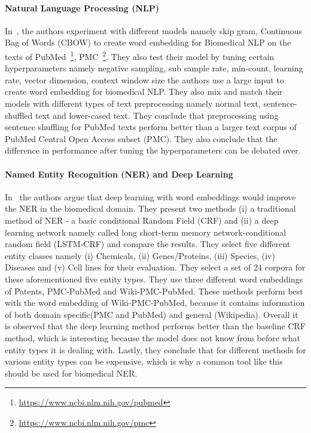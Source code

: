 \paragraph{Natural Language Processing (NLP)}
In~\cite{chiu2016train}, the authors experiment with different models namely skip gram, Continuous Bag of Words (CBOW)  to create word embedding for Biomedical NLP on the texts of PubMed~\footnote{\url{https://www.ncbi.nlm.nih.gov/pubmed}}, PMC~\footnote{\url{https://www.ncbi.nlm.nih.gov/pmc}}. They also test their model by tuning certain hyperparameters namely negative sampling, sub sample rate, min-count, learning rate, vector dimension, context window size the authors use a large input to create word embedding for biomedical NLP. They also mix and match their models with different types of text preprocessing namely normal text, sentence-shuffled text and lower-cased text. They conclude that preprocessing using sentence shuffling for PubMed texts perform better than a larger text corpus of PubMed Central Open Access subset (PMC). They also conclude that the difference in performance after tuning the hyperparameters can be debated over. 

\paragraph{Named Entity Recognition (NER) and Deep Learning}
In~\cite{habibi2017deep} the authors argue that deep learning with word embeddings would improve the NER in the biomedical domain. They present two methods (i) a traditional method of NER - a basic conditional Random Field (CRF) and (ii) a deep learning network namely called long short-term memory network-conditional random field (LSTM-CRF) and compare the results. They select five different entity classes namely (i) Chemicals, (ii) Genes/Proteins, (iii) Species, (iv) Diseases and (v) Cell lines for their evaluation. They select a set of 24 corpora for these aforementioned five entity types. They use three different word embeddings of Patents, PMC-PubMed and Wiki-PMC-PubMed. These methods perform best with the word embedding of Wiki-PMC-PubMed, because it contains information of both domain specific(PMC and PubMed) and general (Wikipedia). Overall it is observed that the deep learning method performs better than the baseline CRF method, which is interesting because the model does not know from before what entity types it is dealing with. 
Lastly, they conclude that for different methods for various entity types can be expensive, which is why a common tool like this should be used for biomedical NER. 

